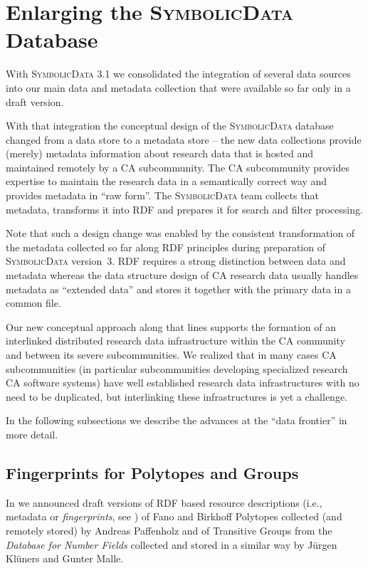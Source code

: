\documentclass[a4paper,11pt]{article}
\def\SD{\textsc{SymbolicData}}
\begin{document}
\section{Enlarging the {\SD} Database}

With {\SD} 3.1 we consolidated the integration of several data sources into our
main data and metadata collection that were available so far only in a draft
version.  

With that integration the conceptual design of the {\SD} database changed from
a data store to a metadata store -- the new data collections provide (merely)
metadata information about research data that is hosted and maintained remotely
by a CA subcommunity. The CA subcommunity provides expertise to maintain the
research data in a semantically correct way and provides metadata in ``raw
form''.  The {\SD} team collects that metadata, transforms it into RDF and
prepares it for search and filter processing. 

Note that such a design change was enabled by the consistent transformation of
the metadata collected so far along RDF principles during preparation of {\SD}
version~3.  RDF requires a strong distinction between data and metadata whereas
the data structure design of CA research data usually handles metadata as
``extended data'' and stores it together with the primary data in a common
file.

Our new conceptual approach along that lines supports the formation of an
interlinked distributed research data infrastructure within the CA community
and between its severe subcommunities. We realized that in many cases CA
subcommunities (in particular subcommunities developing specialized research CA
software systems) have well established research data infrastructures with no
need to be duplicated, but interlinking these infrastructures is yet a
challenge. 

In the following subsections we describe the advances at the ``data frontier''
in more detail.
 
\subsection{Fingerprints for Polytopes and Groups}

In \cite{cicm-14} we announced draft versions of RDF based resource
descriptions (i.e., metadata or \emph{fingerprints}, see \cite{icms-16}) of
Fano and Birkhoff Polytopes collected (and remotely stored) by Andreas
Paffenholz and of Transitive Groups from the \emph{Database for Number Fields}
collected and stored in a similar way by J\"urgen Kl\"uners and Gunter Malle.
\end{document}
